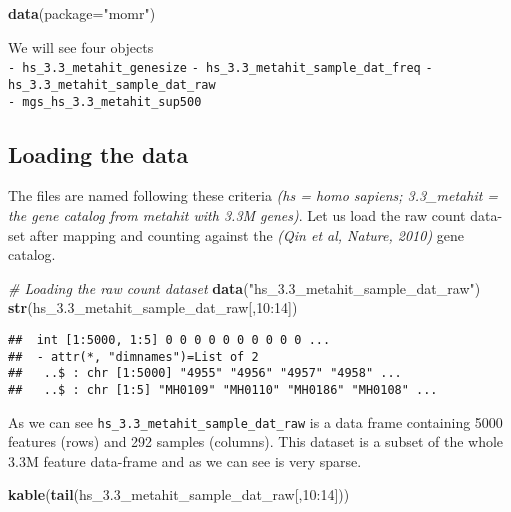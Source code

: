 \documentclass[]{article}
\newenvironment{Shaded}{\begin{snugshade}}{\end{snugshade}}
\newcommand{\KeywordTok}[1]{\textcolor[rgb]{0.13,0.29,0.53}{\textbf{{#1}}}}
\newcommand{\DataTypeTok}[1]{\textcolor[rgb]{0.13,0.29,0.53}{{#1}}}
\newcommand{\DecValTok}[1]{\textcolor[rgb]{0.00,0.00,0.81}{{#1}}}
\newcommand{\StringTok}[1]{\textcolor[rgb]{0.31,0.60,0.02}{{#1}}}
\newcommand{\CommentTok}[1]{\textcolor[rgb]{0.56,0.35,0.01}{\textit{{#1}}}}
\newcommand{\NormalTok}[1]{{#1}}
\begin{document}
\begin{Shaded}
\begin{Highlighting}[]
\KeywordTok{data}\NormalTok{(}\DataTypeTok{package=}\StringTok{"momr"}\NormalTok{)}
\end{Highlighting}
\end{Shaded}

We will see four objects\\\texttt{- hs\_3.3\_metahit\_genesize}
\texttt{- hs\_3.3\_metahit\_sample\_dat\_freq}
\texttt{- hs\_3.3\_metahit\_sample\_dat\_raw}\\\texttt{- mgs\_hs\_3.3\_metahit\_sup500}

\subsection{Loading the data}\label{loading-the-data}

The files are named following these criteria \emph{(hs = homo sapiens;
3.3\_metahit = the gene catalog from metahit with 3.3M genes)}. Let us
load the raw count data-set after mapping and counting against the
\emph{(Qin et al, Nature, 2010)} gene catalog.

\begin{Shaded}
\begin{Highlighting}[]
\CommentTok{# Loading the raw count dataset}
\KeywordTok{data}\NormalTok{(}\StringTok{"hs_3.3_metahit_sample_dat_raw"}\NormalTok{)}
\KeywordTok{str}\NormalTok{(hs_3.3_metahit_sample_dat_raw[,}\DecValTok{10}\NormalTok{:}\DecValTok{14}\NormalTok{])}
\end{Highlighting}
\end{Shaded}

\begin{verbatim}
##  int [1:5000, 1:5] 0 0 0 0 0 0 0 0 0 0 ...
##  - attr(*, "dimnames")=List of 2
##   ..$ : chr [1:5000] "4955" "4956" "4957" "4958" ...
##   ..$ : chr [1:5] "MH0109" "MH0110" "MH0186" "MH0108" ...
\end{verbatim}

As we can see \texttt{hs\_3.3\_metahit\_sample\_dat\_raw} is a data
frame containing 5000 features (rows) and 292 samples (columns). This
dataset is a subset of the whole 3.3M feature data-frame and as we can
see is very sparse.

\begin{Shaded}
\begin{Highlighting}[]
\KeywordTok{kable}\NormalTok{(}\KeywordTok{tail}\NormalTok{(hs_3.3_metahit_sample_dat_raw[,}\DecValTok{10}\NormalTok{:}\DecValTok{14}\NormalTok{]))}
\end{Highlighting}
\end{Shaded}
\end{document}
